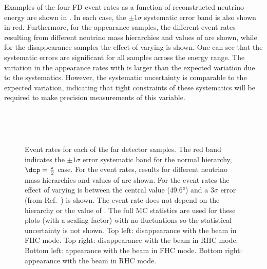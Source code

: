 Examples of the four FD event rates as a function of reconstructed neutrino energy are shown in .
In each case, the $\pm1\sigma$ systematic error band is also shown in red.
Furthermore, for the appearance samples, the different event rates resulting from different neutrino mass hierarchies and values of \dcp are shown, while for the disappearance samples the effect of varying  is shown.
One can see that the systematic errors are significant for all samples across the energy range.
The variation in the appearance rates with \dcp is larger than the expected variation due to the systematics.
However, the systematic uncertainty is comparable to the expected  variation, indicating that tight constraints of these systematics will be required to make precision measurements of this variable.

\begin{figure}
	\begin{minipage}[t]{.5\linewidth}
		\begin{adjustbox}{max totalsize=\linewidth, center}
			
		\end{adjustbox} \\
		\begin{adjustbox}{max totalsize=\linewidth, center}
			
		\end{adjustbox}
	\end{minipage}
	\hfill
	\begin{minipage}[t]{.5\linewidth}
		\begin{adjustbox}{max totalsize=\linewidth, center}
			
		\end{adjustbox} \\
		\begin{adjustbox}{max totalsize=\linewidth, center}
			
		\end{adjustbox}
	\end{minipage}
	\caption[DUNE far detector event rates with systematic error bands.]{Event rates for each of the far detector samples. The red band indicates the $\pm1\sigma$ error systematic band for the normal hierarchy, $\dcp = \frac{\pi}{2}$ case. For the \nue event rates, results for different neutrino mass hierarchies and values of \dcp are shown. For the \numu event rates the effect of varying  is between the central value (\ang{49.6}) and a $3\sigma$ error (from Ref.~\cite{nufit4}) is shown. The \numu event rate does not depend on the hierarchy or the value of \dcp. The full MC statistics are used for these plots (with a scaling factor) with no fluctuations so the statistical uncertainty is not shown. Top left: \numu disappearance with the beam in FHC mode. Top right: \numu disappearance with the beam in RHC mode. Bottom left: \nue appearance with the beam in FHC mode. Bottom right: \nue appearance with the beam in RHC mode.}
	\label{fig:fdEventRatesWithErrorBand}
\end{figure}


